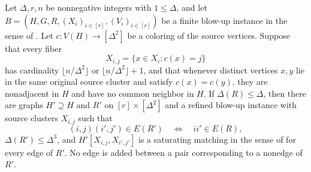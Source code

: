 \begin{lemma}
Let $\Delta,r,n$ be nonnegative integers with $1\leq\Delta$, and let
$B=(H,G,R,(X_i)_{i\in[r]},(V_i)_{i\in[r]})$ be a finite blow-up
instance in the sense of .  Let
$c\colon V(H)\to[\Delta^2]$ be a coloring of the source vertices.  Suppose that every fiber
\[
 X_{i,j}=\{x\in X_i:c(x)=j\}
\]
has cardinality $\lfloor n/\Delta^2\rfloor$ or $\lfloor n/\Delta^2\rfloor+1$, and that whenever distinct vertices $x,y$ lie in the same original source cluster and satisfy $c(x)=c(y)$, they are nonadjacent in $H$ and have no common neighbor in $H$.  If $\Delta(R)\leq\Delta$, then there are graphs $H'\supseteq H$ and $R'$ on $[r]\times[\Delta^2]$ and a refined blow-up instance with source clusters $X_{i,j}$ such that
\[
 (i,j)(i',j')\in E(R')\quad\Longleftrightarrow\quad ii'\in E(R),
\]
$\Delta(R')\leq\Delta^3$, and $H'[X_{i,j},X_{i',j'}]$ is a saturating matching in the sense of  for every edge of $R'$.  No edge is added between a pair corresponding to a nonedge of $R'$.
\end{lemma}
